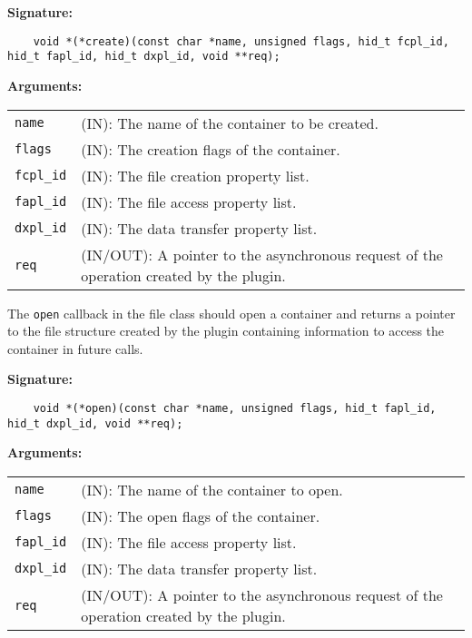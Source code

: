 \begin{mdframed}[style=bgbox]
\textbf{Signature:}
\begin{lstlisting}
    void *(*create)(const char *name, unsigned flags, hid_t fcpl_id, hid_t fapl_id, hid_t dxpl_id, void **req);
\end{lstlisting}

\textbf{Arguments:}\\
\begin{tabular}{l p{13.5cm}}
  \texttt{name} & (IN): The name of the container to be created.\\
  \texttt{flags} & (IN): The creation flags of the container.\\
  \texttt{fcpl\_id} & (IN): The file creation property list.\\
  \texttt{fapl\_id} & (IN): The file access property list.\\
  \texttt{dxpl\_id} & (IN): The data transfer property list.\\
  \texttt{req} & (IN/OUT): A pointer to the asynchronous request of the
  operation created by the plugin.\\
\end{tabular}
\end{mdframed}
\hspace*{\fill}
The \texttt{open} callback in the file class should open a container and
returns a pointer to the file structure created by the plugin containing information to
access the container in future calls.\bigskip

\begin{mdframed}[style=bgbox] 
\textbf{Signature:}
\begin{lstlisting}
    void *(*open)(const char *name, unsigned flags, hid_t fapl_id, hid_t dxpl_id, void **req);
\end{lstlisting}

\textbf{Arguments:}\\
\begin{tabular}{l p{13.5cm}}
  \texttt{name} & (IN): The name of the container to open.\\
  \texttt{flags} & (IN): The open flags of the container.\\
  \texttt{fapl\_id} & (IN): The file access property list.\\
  \texttt{dxpl\_id} & (IN): The data transfer property list.\\
  \texttt{req} & (IN/OUT): A pointer to the asynchronous request of the
  operation created by the plugin.\\
\end{tabular}
\end{mdframed}

